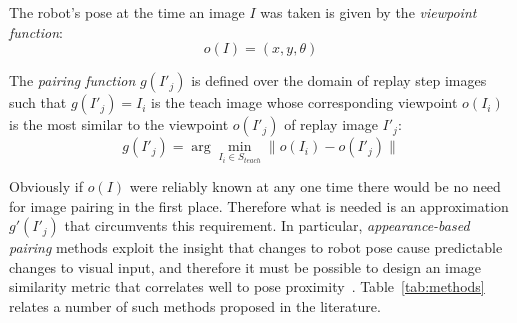 \documentclass[twocolumn, 9pt,fleqn]{jsproceedings}
\begin{document}
The robot's pose at the time an image $I$ was taken is given by the \textit{viewpoint function}:
\begin{equation}
o(I) = (x, y, \theta)
\end{equation}

The \textit{pairing function} $g(I'_j)$ is defined over the domain of replay step images such that  $g(I'_j) = I_i$ is the teach image whose corresponding viewpoint $o(I_i)$ is the most similar to the viewpoint $o(I'_j)$ of replay image $I'_j$:
\begin{equation}
g(I'_j) = \arg \min_{I_i \in S_{teach}} {\|o(I_i) - o(I'_j)\|}
\end{equation}

Obviously if $o(I)$ were reliably known at any one time there would be no need for image pairing in the first place. Therefore what is needed is an approximation $g'(I'_j)$ that circumvents this requirement. In particular, \textit{appearance-based pairing} methods exploit the insight that changes to robot pose cause predictable changes to visual input, and therefore it must be possible to design an image similarity metric that correlates well to pose proximity~\cite{HEL13b}. Table~\ref{tab:methods} relates a number of such methods proposed in the literature.
\end{document}
